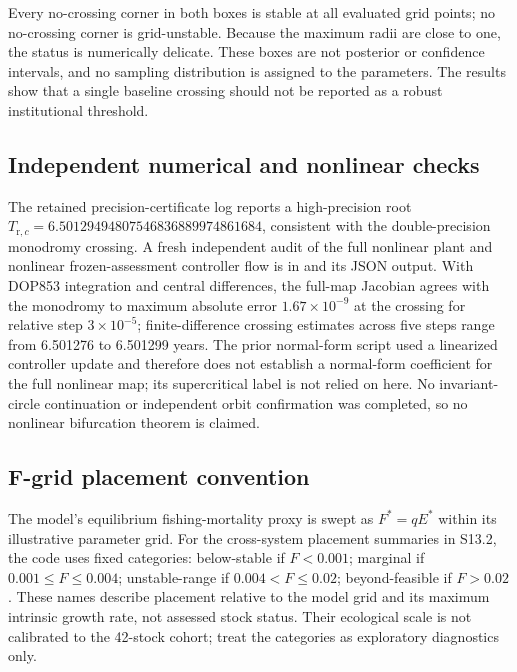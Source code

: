Every no-crossing corner in both boxes is stable at all evaluated grid points; no no-crossing corner is grid-unstable. Because the maximum radii are close to one, the status is numerically delicate. These boxes are not posterior or confidence intervals, and no sampling distribution is assigned to the parameters. The results show that a single baseline crossing should not be reported as a robust institutional threshold.

\subsection{Independent numerical and nonlinear checks}

The retained precision-certificate log reports a high-precision root \(T_{\mathrm r,c}=6.50129494807546836889974861684\), consistent with the double-precision monodromy crossing. A fresh independent audit of the full nonlinear plant and nonlinear frozen-assessment controller flow is in \texttt{} and its JSON output. With DOP853 integration and central differences, the full-map Jacobian agrees with the monodromy to maximum absolute error \(1.67\times10^{-9}\) at the crossing for relative step \(3\times10^{-5}\); finite-difference crossing estimates across five steps range from 6.501276 to 6.501299 years. The prior normal-form script used a linearized controller update and therefore does not establish a normal-form coefficient for the full nonlinear map; its supercritical label is not relied on here. No invariant-circle continuation or independent orbit confirmation was completed, so no nonlinear bifurcation theorem is claimed.

\subsection{F-grid placement convention}

The model's equilibrium fishing-mortality proxy is swept as \(F^*=qE^*\) within its illustrative parameter grid. For the cross-system placement summaries in S13.2, the code uses fixed categories: below-stable if \(F<0.001\); marginal if \(0.001\leq F\leq0.004\); unstable-range if \(0.004<F\leq0.02\); beyond-feasible if \(F>0.02\). These names describe placement relative to the model grid and its maximum intrinsic growth rate, not assessed stock status. Their ecological scale is not calibrated to the 42-stock cohort; treat the categories as exploratory diagnostics only.

